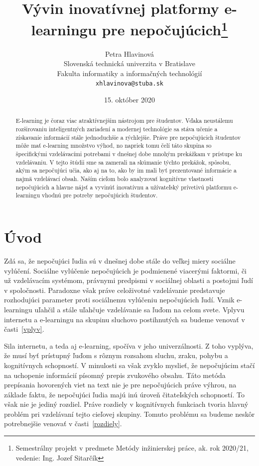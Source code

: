 \documentclass[10pt,oneside,slovak,a4paper]{article}
\title{Vývin inovatívnej platformy e-learningu pre nepočujúcich\thanks{Semestrálny projekt v predmete Metódy inžinierskej práce, ak. rok 2020/21, vedenie: Ing. Jozef Sitarčík}} %
\author{Petra Hlavinová\\[2pt]
	{\small Slovenská technická univerzita v Bratislave}\\
	{\small Fakulta informatiky a informačných technológií}\\
	{\small \texttt{xhlavinova@stuba.sk}}
	}
\date{\small 15. október 2020} %
\begin{document}
\maketitle

\begin{abstract}
E-learning je čoraz viac atraktívnejším nástrojom pre študentov. Vďaka neustálemu rozširovaniu inteligentných zariadení a modernej technológie sa stáva učenie a získavanie informácií stále jednoduchšie a rýchlejšie. Práve pre nepočujúcich študentov môže mať e-learning množstvo výhod, no napriek tomu čelí táto skupina so špecifickými vzdelávacími potrebami v dnešnej dobe mnohým prekážkam v prístupe ku vzdelávaniu. V tejto štúdii sme sa zamerali na skúmanie týchto prekážok, spôsobu, akým sa nepočujúci učia, ako aj na to, ako by im mali byť prezentované informácie a najmä vzdelávací obsah. Naším cieľom bolo analyzovať kognitívne vlastnosti nepočujúcich a hlavne nájsť a vyvinúť inovatívnu a užívateľský prívetivú platformu e-learningu vhodnú pre potreby nepočujúcich študentov. 
\end{abstract}

\section{Úvod}

Zdá sa, že nepočujúci ľudia sú v dnešnej dobe stále do veľkej miery sociálne vylúčení. Sociálne vylúčenie nepočujúcich je podmienené viacerými faktormi, či už vzdelávacím systémom, právnymi predpismi v sociálnej oblasti a postojmi ľudí v spoločnosti. Paradoxne však práve celoživotné vzdelávanie predstavuje rozhodujúci parameter proti sociálnemu vylúčeniu nepočujúcich ľudí. Vznik e-learningu uľahčil a stále uľahčuje vzdelávanie sa ľuďom na celom svete. Vplyvu internetu a e-learningu na skupinu sluchovo postihnutých sa budeme venovať v časti~\ref{vplyv}.

Sila internetu, a teda aj e-learning, spočíva v jeho univerzálnosti. Z toho vyplýva, že musí byť prístupný ľuďom s rôznym rozsahom sluchu, zraku, pohybu a kognitívnych schopností. V minulosti sa však zvyklo myslieť, že nepočujúcim stačí na uchopenie informácií písomný prepis zvukového obsahu. Táto metóda prepísania hovorených viet na text nie je pre nepočujúcich práve výhrou, na základe faktu, že nepočujúci ľudia majú inú úroveň čitateľských schopností. To však nie je jediný rozdiel. Práve rozdiely v kognitívnych funkciach tvoria hlavný problém pri vzdelávaní tejto cieľovej skupiny. Tomuto problému sa budeme neskôr potrebnejšie venovať v časti~\ref{rozdiely}.
 
\end{document}
